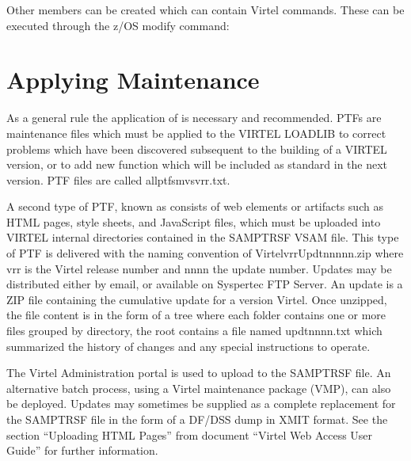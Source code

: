 \documentclass[letterpaper,10pt,english]{sphinxmanual}
\begin{document}
\sphinxAtStartPar
Other members can be created which can contain Virtel commands. These can be executed through the z/OS modify command: \sphinxhyphen{}

\begin{sphinxVerbatim}[commandchars=\\\{\}]
  
\end{sphinxVerbatim}

\newpage

\ignorespaces 

\section{Applying Maintenance}
\label{\detokenize{Installation_Guide:applying-maintenance}}\label{\detokenize{Installation_Guide:index-5}}
\sphinxAtStartPar
As a general rule the application of  is necessary and recommended. PTFs are maintenance files which must be applied to the VIRTEL LOADLIB to correct problems which have been discovered subsequent to the building of a VIRTEL version, or to add new function which will be included as standard in the next version. PTF files are called allptfs\sphinxhyphen{}mvsvrr.txt.

\sphinxAtStartPar
A second type of PTF, known as  consists of web elements or artifacts such as HTML pages, style sheets, and JavaScript files, which must be uploaded into VIRTEL internal directories contained in the SAMPTRSF VSAM file. This type of PTF is delivered with the naming convention of VirtelvrrUpdtnnnnn.zip where vrr is the Virtel release number and nnnn the update number. Updates may be distributed either by e\sphinxhyphen{}mail, or available on Syspertec FTP Server. An update is a ZIP file containing the cumulative update for a version Virtel. Once unzipped, the file content is in the form of a tree where each folder contains one or more files grouped by directory, the root contains a file named updtnnnn.txt which summarized the history of changes and any special instructions to operate.

\sphinxAtStartPar
The Virtel Administration portal is used to upload  to the SAMPTRSF file. An alternative batch process, using a Virtel maintenance package (VMP), can also be deployed. Updates may sometimes be supplied as a complete replacement for the SAMPTRSF file in the form of a DF/DSS dump in XMIT format. See the section “Uploading HTML Pages” from document “Virtel Web Access User Guide” for further information.
\end{document}
